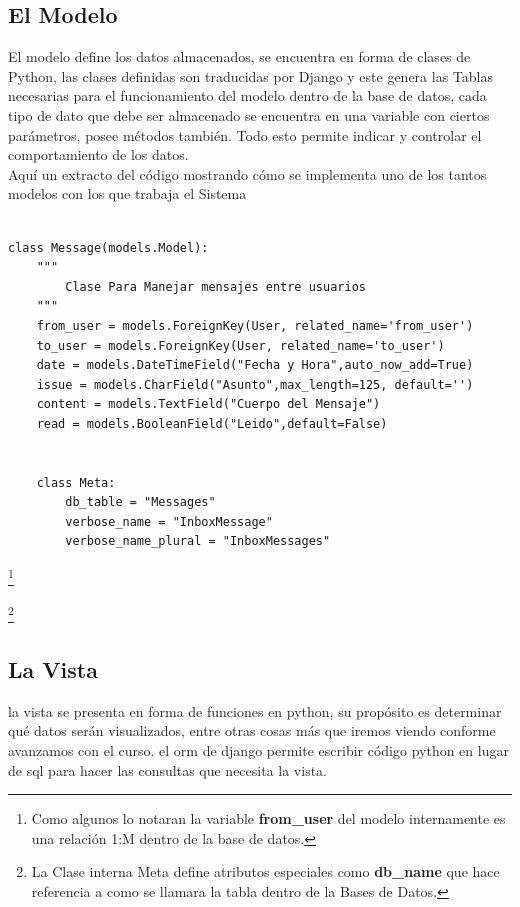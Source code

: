 \subsection{El Modelo}

El modelo define los datos almacenados, se encuentra en forma de clases de Python, las clases definidas son traducidas por Django y este genera las Tablas necesarias para el funcionamiento del modelo dentro de la base de datos, cada tipo de dato que debe ser almacenado se encuentra en una variable con ciertos parámetros, posee métodos también. Todo esto permite indicar y controlar el comportamiento de los datos.\\[0.1cm]

Aquí un extracto del código mostrando cómo se implementa uno de los tantos modelos con los que trabaja el Sistema\\[0.3cm]


\begin{lstlisting}[style=Python]

class Message(models.Model):
    """
        Clase Para Manejar mensajes entre usuarios
    """
    from_user = models.ForeignKey(User, related_name='from_user')
    to_user = models.ForeignKey(User, related_name='to_user')
    date = models.DateTimeField("Fecha y Hora",auto_now_add=True)
    issue = models.CharField("Asunto",max_length=125, default='')
    content = models.TextField("Cuerpo del Mensaje")
    read = models.BooleanField("Leido",default=False)


    class Meta:
        db_table = "Messages"
        verbose_name = "InboxMessage"
        verbose_name_plural = "InboxMessages"
\end{lstlisting}

\footnote{Como algunos lo notaran la variable \textbf{from\_user} del modelo internamente es una relación 1:M dentro de la base de datos.}

\footnote{La Clase interna Meta define atributos especiales como \textbf{db\_name} que hace referencia a como se llamara la tabla dentro de la Bases de Datos.}

\vspace{0.1cm}

\subsection{La Vista}
la vista se presenta en forma de funciones en python, su propósito es determinar qué datos serán visualizados, entre otras cosas más que iremos viendo conforme avanzamos con el curso. el orm de django permite escribir código python en lugar de sql para hacer las consultas que necesita la vista. \\[0.1cm]

